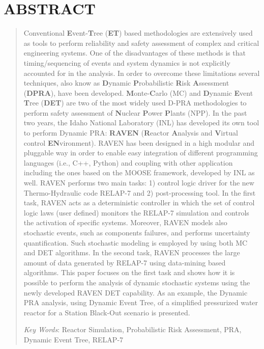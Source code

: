 \documentclass{mc2013}
\begin{document}
\section*{ABSTRACT} 
\begin{quote}
\begin{small}
Conventional \textbf{E}vent-\textbf{T}ree (\textbf{ET}) based methodologies are extensively used as tools to perform reliability and safety assessment of complex and critical engineering systems. 
One of the disadvantages of these methods is that timing/sequencing of events and system dynamics is not explicitly accounted for in the analysis.
In order to overcome these limitations several techniques, also know as \textbf{D}ynamic \textbf{P}robabilistic \textbf{R}isk \textbf{A}ssessment (\textbf{DPRA}), have been developed. \textbf{M}onte-\textbf{C}arlo (MC) and \textbf{D}ynamic \textbf{E}vent \textbf{T}ree (\textbf{DET}) are two of the most widely used D-PRA methodologies to perform safety assessment of \textbf{N}uclear \textbf{P}ower \textbf{P}lants (NPP).
In the past two years, the Idaho National Laboratory (INL) has developed its own tool to perform Dynamic PRA: \textbf{RAVEN} (\textbf{R}eactor \textbf{A}nalysis and \textbf{V}irtual control \textbf{EN}vironment).
RAVEN has been designed in a high modular and pluggable way in order to enable easy integration of different programming languages (i.e., C++, Python) and coupling with other application including the ones based on the MOOSE framework, developed by INL as well.
RAVEN performs two main tasks: 1) control logic driver for the new Thermo-Hydraulic code RELAP-7 and 2) post-processing tool.
In the first task, RAVEN acts as a deterministic controller in which the set of control logic laws (user defined) monitors the RELAP-7 simulation and controls the activation of specific systems.
Moreover, RAVEN models also stochastic events, such as components failures, and performs uncertainty quantification. Such stochastic modeling is employed by using both MC and DET algorithms.
In the second task, RAVEN processes the large amount of data generated by RELAP-7 using data-mining based algorithms.
This paper focuses on the first task and shows how it is possible to perform the analysis of dynamic stochastic systems using the newly developed RAVEN DET capability.
As an example, the Dynamic PRA analysis, using Dynamic Event Tree, of a simplified pressurized water reactor for a Station Black-Out scenario is presented.

\emph{Key Words}: Reactor Simulation, Probabilistic Risk Assessment, PRA, Dynamic Event Tree, RELAP-7 %
\end{small} 
\end{quote}
\end{document}
